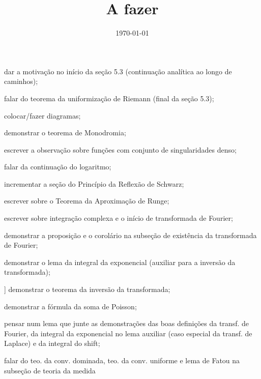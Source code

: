 \documentclass[12pt,a4paper]{article}
\title{A fazer}
\author{}
\date{\today}
\newcommand{\cmark}{\ding{51}}%
\newcommand{\done}{\rlap{$\square$}{\raisebox{2pt}{\large\hspace{1pt}\cmark}}%
\hspace{-2.5pt}}
\begin{document}
\maketitle

\begin{todolist}
    \item dar a motivação no início da seção 5.3 (continuação analítica ao longo
    de caminhos);
    \item falar do teorema da uniformização de Riemann (final da seção 5.3); 
    \item colocar/fazer diagramas;
    \item[\done] demonstrar o teorema de Monodromia;
    \item[\done] escrever a observação sobre funções com conjunto de singularidades denso;
    \item[\done] falar da continuação do logaritmo;
    \item[\done] incrementar a seção do Princípio da Reflexão de Schwarz;
    \item[\done] escrever sobre o Teorema da Aproximação de Runge;
    \item[\done] escrever sobre integração complexa e o início de transformada de Fourier;
    \item[\done] demonstrar a proposição e o corolário na subseção de existência da transformada de Fourier;
    \item[\done] demonstrar o lema da integral da exponencial (auxiliar para a inversão da transformada);
    \item[\done]] demonstrar o teorema da inversão da transformada;
    \item demonstrar a fórmula da soma de Poisson;
    \item pensar num lema que junte as demonstrações das boas definições da transf. de Fourier,
          da integral da exponencial no lema auxiliar (caso especial da transf. de Laplace) e
          da integral do shift;
    \item falar do teo. da conv. dominada, teo. da conv. uniforme e lema de
    Fatou na subseção de teoria da medida

\end{todolist}
\end{document}

